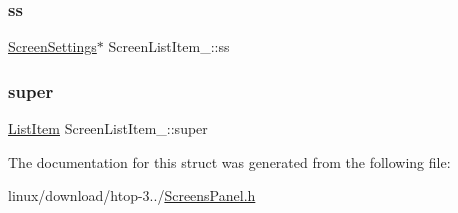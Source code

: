 \subsubsection{\texorpdfstring{ss}{ss}}
{\footnotesize\ttfamily \hyperlink{Settings_8h_a86d3dc963e563d775d50b8cc2b77afb8}{Screen\+Settings}$\ast$ Screen\+List\+Item\+\_\+\+::ss}

\mbox{\label{structScreenListItem___a7e800dd530c06c4646ffc77ec727752c}} 
\subsubsection{\texorpdfstring{super}{super}}
{\footnotesize\ttfamily \hyperlink{ListItem_8h_a311dfe5c572117175446997a9e6f15b8}{List\+Item} Screen\+List\+Item\+\_\+\+::super}



The documentation for this struct was generated from the following file\+:\begin{DoxyCompactItemize}
\item 
linux/download/htop-\/3../\hyperlink{ScreensPanel_8h}{Screens\+Panel.\+h}\end{DoxyCompactItemize}
